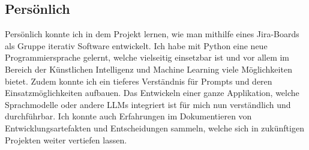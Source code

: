 \subsection{Persönlich}
Persönlich konnte ich in dem Projekt lernen, wie man mithilfe eines Jira-Boards als Gruppe iterativ Software entwickelt.
Ich habe mit Python eine neue Programmiersprache gelernt, welche vielseitig einsetzbar ist und vor allem im Bereich der
Künstlichen Intelligenz und Machine Learning viele Möglichkeiten bietet. Zudem konnte ich ein tieferes Verständnis für
Prompts und deren Einsatzmöglichkeiten aufbauen. Das Entwickeln einer ganze Applikation, welche Sprachmodelle oder
andere LLMs integriert ist für mich nun verständlich und durchführbar. Ich konnte auch Erfahrungen im Dokumentieren von
Entwicklungsartefakten und Entscheidungen sammeln, welche sich in zukünftigen Projekten weiter vertiefen lassen. 